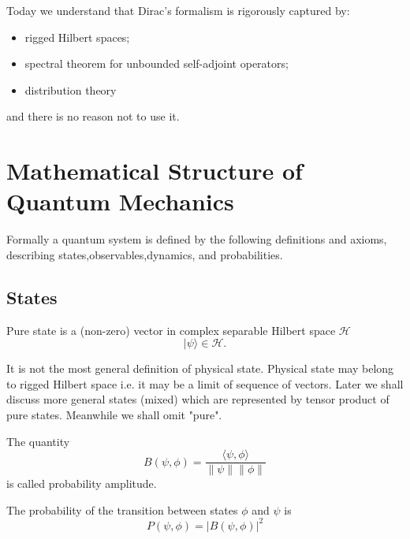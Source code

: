 Today we understand that Dirac’s formalism is rigorously captured by:
\begin{itemize}
   \item rigged Hilbert spaces;
\item spectral theorem for unbounded self-adjoint operators;
\item distribution theory
\end{itemize}
and there is no reason not to use it.

\section{Mathematical Structure of Quantum Mechanics}
\label{cq:msqm}

Formally a quantum system is defined by the following definitions and axioms,
describing states,observables,dynamics, and probabilities.
\subsection{States}
    \label{cq:sts}
\begin{definition}
    Pure state is a (non-zero) vector in complex separable Hilbert space $ \mathcal{H} $
\[ |\psi \rangle \in \mathcal{H} .\]
\end{definition}
It is not the most general definition of physical state. Physical state may belong to rigged 
Hilbert space i.e. it may be a limit of sequence of vectors. 
Later we shall discuss more general states (mixed) which are represented by tensor product of
pure states. Meanwhile we shall omit "pure".

\begin{definition}
    The quantity
    \begin{equation}
       \label {cq:pa}
        B(\psi,\phi)=\frac{\langle{\psi},{\phi}\rangle}{\|{\psi}\| \|{\phi}\|}  
    \end{equation} 
    is called probability amplitude.
\end{definition}  
\begin{axiom}
     The probability of the transition between states $ \phi $ and $ \psi $ is
     \begin{equation}
        \label {cq:br}
         P(\psi,\phi)=|B(\psi,\phi)|^2
     \end{equation}
\end{axiom}

